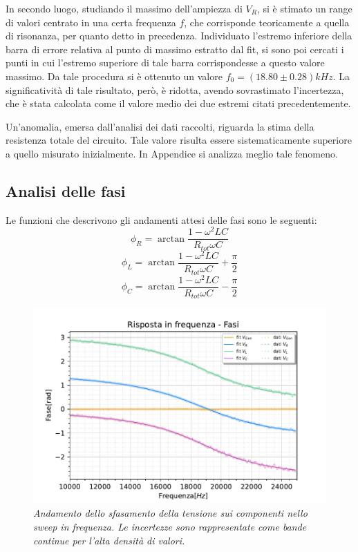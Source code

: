 In secondo luogo, studiando il massimo dell'ampiezza di $V_R$, si è stimato un range di valori centrato in
una certa frequenza $f$, che corrisponde teoricamente a quella di risonanza, per quanto detto in precedenza.
Individuato l’estremo inferiore della barra di errore relativa al punto di massimo estratto dal fit, si sono poi cercati i
punti in cui l’estremo superiore di tale barra corrispondesse a questo valore massimo.
Da tale procedura si è ottenuto un valore $f_0 = (18.80 \pm 0.28)kHz$.
La significatività di tale risultato, però, è ridotta, avendo sovrastimato l’incertezza, che è stata calcolata come il
valore medio dei due estremi citati precedentemente.

Un'anomalia, emersa dall'analisi dei dati raccolti, riguarda la stima della resistenza totale del circuito.
Tale valore risulta essere sistematicamente superiore a quello misurato inizialmente. In Appendice si analizza meglio
tale fenomeno.


\subsection{Analisi delle fasi}

Le funzioni che descrivono gli andamenti attesi delle fasi sono le seguenti:
 \begin{equation}\label{eq:fase_R}
     \phi_R = \arctan{\frac{1 - \omega^2 L C}{R_{tot} \omega C}}
 \end{equation}
 \begin{equation}
     \phi_L = \arctan{\frac{1 - \omega^2 L C}{R_{tot}  \omega C}} + \frac{\pi}{2}
 \end{equation}
\begin{equation}
    \phi_C = \arctan{\frac{1 - \omega^2 L C}{R_{tot}  \omega C}} - \frac{\pi}{2}
\end{equation}


\begin{figure}[h]
    \centering
    \includegraphics[width=.75\textwidth]{../figs/Risposta-in-frequenza-fasi.pdf}
    \caption{\emph{Andamento dello sfasamento della tensione sui componenti nello sweep in frequenza. Le incertezze
    sono rappresentate come bande continue per l'alta densità di valori.}}
    \label{fig:fasi}
\end{figure}

